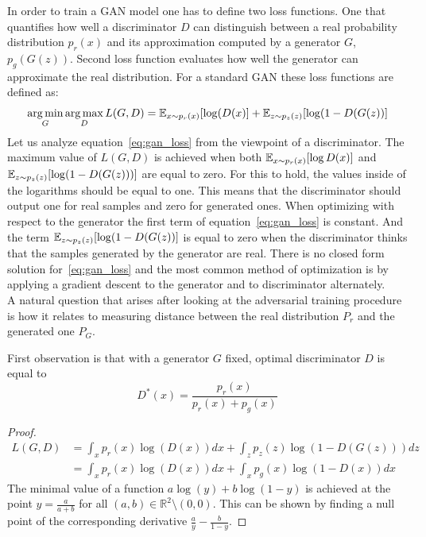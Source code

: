 \indent In order to train a GAN model one has to define two loss functions. One that quantifies how well a discriminator $D$ can distinguish between a real probability distribution $p_r(x)$ and its approximation computed by a generator $G$, $p_g(G(z))$. Second loss function evaluates how well the generator can approximate the real distribution. For a standard GAN these loss functions are defined as: 
\begin{equation} \label{eq:gan_loss}
\operatorname*{arg\,min}_G \operatorname*{arg\,max}_D L(G,D) = \operatorname{\mathbb{E}}_{x \sim p_r(x)} [\log(D(x)] + \operatorname{\mathbb{E}}_{z \sim p_z(z)}[\log(1-D(G(z))]
\end{equation}
Let us analyze equation~\ref{eq:gan_loss} from the viewpoint of a discriminator. The maximum value of $L(G,D)$ is achieved when both $\operatorname{\mathbb{E}}_{x \sim p_r(x)} [\log D(x)]$ and $\operatorname{\mathbb{E}}_{z \sim p_z(z)}[\log(1-D(G(z)))]$ are equal to zero. For this to hold, the values inside of the  logarithms should be equal to one. This means that the discriminator should output one for real samples and zero for generated ones. When optimizing with respect to the generator the first term of equation~\ref{eq:gan_loss} is constant. And the term $\operatorname{\mathbb{E}}_{z \sim p_z(z)}[\log(1-D(G(z))]$ is equal to zero when the discriminator thinks that the samples generated by the generator are real. There is no closed form solution for~\ref{eq:gan_loss} and the most common method of optimization is by applying a gradient descent to the generator and to discriminator alternately.\\  

\indent A natural question that arises after looking at the adversarial training procedure is how it relates to measuring distance between the real distribution $P_r$ and the generated one $P_G$. 

First observation is that with a generator $G$ fixed, optimal discriminator $D$ is equal to
\begin{equation}
	D^*(x) = \frac{p_r(x)}{p_r(x) + p_g(x)}
\end{equation}
\begin{proof}
	\begin{align*}
		L(G, D) &= \int_x p_r(x)\log(D(x))dx + \int_z p_z(z)\log(1 - D(G(z))) dz \\
		&= \int_x p_r(x)\log(D(x))dx + \int_x p_g(x)\log(1 - D(x)) dx
	\end{align*}
The minimal value of a function $a\log(y) + b\log(1-y)$ is achieved at the point $y = \frac{a}{a+b}$ for all $(a,b) \in \mathbb{R}^2 \setminus (0,0)$. This can be shown by finding a null point of the corresponding derivative $\frac{a}{y} - \frac{b}{1-y}$.
\end{proof}

